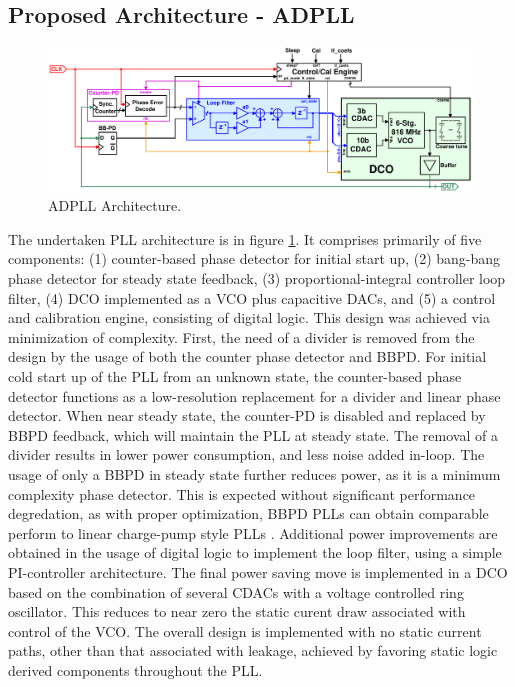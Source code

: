 \subsection{Proposed Architecture - ADPLL}\label{pll_arch}
			\begin{figure}[htb!]
		        \centering
		        \includegraphics[width=1\textwidth, angle=0]{./figs/design/pll_master_arch_final}
			    \caption{ADPLL Architecture.}
			    \label{fig:pll_arch}
			\end{figure}
	The undertaken PLL architecture is in figure \ref{fig:pll_arch}. It comprises primarily of five components: (1) counter-based phase detector for initial start up, (2) bang-bang phase detector for steady state feedback, (3) proportional-integral controller loop filter, (4) DCO implemented as a VCO plus capacitive DACs, and (5) a control and calibration engine, consisting of digital logic. This design was achieved via minimization of complexity. First, the need of a divider is removed from the design by the usage of both the counter phase detector and BBPD. For initial cold start up of the PLL from an unknown state, the counter-based phase detector functions as a low-resolution replacement for a divider and linear phase detector. When near steady state, the counter-PD is disabled and replaced by BBPD feedback, which will maintain the PLL at steady state. The removal of a divider results in lower power consumption, and less noise added in-loop. The usage of only a BBPD in steady state further reduces power, as it is a minimum complexity phase detector. This is expected without significant performance degredation, as with proper optimization, BBPD PLLs can obtain comparable perform to linear charge-pump style PLLs \cite{xu_abidi_2017}. Additional power improvements are obtained in the usage of digital logic to implement the loop filter, using a simple PI-controller architecture. The final power saving move is implemented in a DCO based on the combination of several CDACs with a voltage controlled ring oscillator. This reduces to near zero the static curent draw associated with control of the VCO. The overall design is implemented with no static current paths, other than that associated with leakage, achieved by favoring static logic derived components throughout the PLL.



